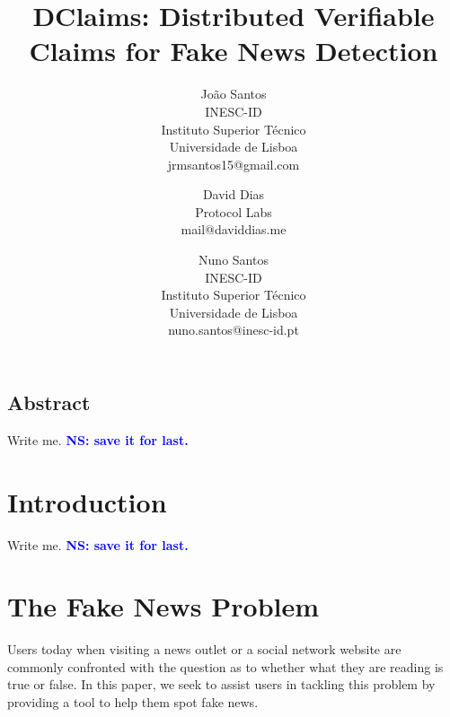 \documentclass[letterpaper,twocolumn,10pt]{article}
\newcommand{\note}[1]{\textcolor{blue}{\bf #1}}
\begin{document}
\date{}

\title{\Large \bf DClaims: Distributed Verifiable Claims for Fake News Detection}

\author{
  {\rm João Santos}\\
  INESC-ID\\
  Instituto Superior T\'{e}cnico\\
  Universidade de Lisboa\\
  jrmsantos15@gmail.com
  \and
  {\rm David Dias}\\
  Protocol Labs\\
  mail@daviddias.me
  \and
  {\rm Nuno Santos}\\
  INESC-ID\\
  Instituto Superior T\'{e}cnico\\
  Universidade de Lisboa\\
  nuno.santos@inesc-id.pt
}

\maketitle

\thispagestyle{empty}


\subsection*{Abstract}
Write me. \note{NS: save it for last.}

\section{Introduction}

Write me. \note{NS: save it for last.}

\clearpage

\section{The Fake News Problem}

Users today when visiting a news outlet or a social network website are commonly confronted with the question as to whether what they are reading is true or false. In this paper, we seek to assist users in tackling this problem by providing a tool to help them spot fake news.
\end{document}
